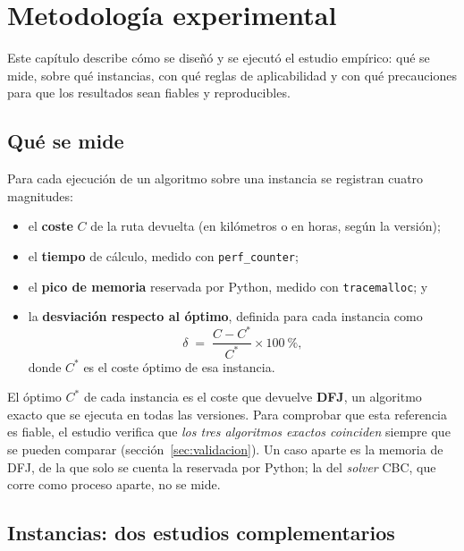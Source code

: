 \chapter{Metodología experimental}\label{cap:metodologia}

Este capítulo describe cómo se diseñó y se ejecutó el estudio empírico: qué se mide, sobre qué instancias, con qué reglas de aplicabilidad y con qué precauciones para que los resultados sean fiables y reproducibles.

\section{Qué se mide}

Para cada ejecución de un algoritmo sobre una instancia se registran cuatro magnitudes:
\begin{itemize}
  \item el \textbf{coste} $C$ de la ruta devuelta (en kilómetros o en horas, según la versión);
  \item el \textbf{tiempo} de cálculo, medido con \texttt{perf\_counter};
  \item el \textbf{pico de memoria} reservada por Python, medido con \texttt{tracemalloc}; y
  \item la \textbf{desviación respecto al óptimo}, definida para cada instancia como
  \begin{equation}\label{eq:desviacion}
    \delta\;=\;\frac{C-C^{*}}{C^{*}}\times 100\ \%,
  \end{equation}
  donde $C^{*}$ es el coste óptimo de esa instancia.
\end{itemize}
El óptimo $C^{*}$ de cada instancia es el coste que devuelve \textbf{DFJ}, un algoritmo exacto que se ejecuta en todas las versiones. Para comprobar que esta referencia es fiable, el estudio verifica que
\emph{los tres algoritmos exactos coinciden} siempre que se pueden comparar (sección~\ref{sec:validacion}). Un caso aparte es la memoria de DFJ, de la que solo se cuenta la reservada por Python; la del \emph{solver} CBC, que corre como proceso aparte, no se mide.

\section{Instancias: dos estudios complementarios}

